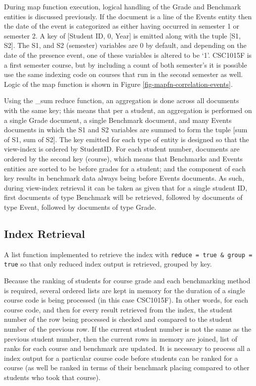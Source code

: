 During map function execution, logical handling of the Grade and Benchmark entities is discussed previously. If the document is a line of the Events entity then the date of the event is categorized as either having occurred in semester 1 or semester 2. A key of [Student ID, 0, Year] is emitted along with the tuple [S1, S2]. The S1, and S2 (semester) variables are 0 by default, and depending on the date of the presence event, one of these variables is altered to be `1'. CSC1015F is a first semester course, but by including a count of both semester's it is possible use the same indexing code on courses that run in the second semester as well. Logic of the map function is shown in Figure \ref{fig-mapfn-correlation-events}.

Using the \_sum reduce function, an aggregation is done across all documents with the same key; this means that per a student, an aggregation is performed on a single Grade document, a single Benchmark document, and many Events documents in which the S1 and S2 variables are summed to form the tuple [sum of S1, sum of S2]. The key emitted for each type of entity is designed so that the view-index is ordered by StudentID. For each student number, documents are ordered by the second key (course), which means that Benchmarks and Events entities are sorted to be before grades for a student; and the  component of each key results in benchmark data always being before Events documents. As such, during view-index retrieval it can be taken as given that for a single student ID, first documents of type Benchmark will be retrieved, followed by documents of type Event, followed by documents of type Grade.



\subsection{Index Retrieval}
A list function implemented to retrieve the index with \texttt{reduce = true \& group = true} so that only reduced index output is retrieved, grouped by key.

Because the ranking of students for course grade and each benchmarking method is required, several ordered lists are kept in memory for the duration of a single course code is being processed (in this case CSC1015F). In other words, for each course code, and then for every result retrieved from the index, the student number of the row being processed is checked and compared to the student number of the previous row. If the current student number is not the same as the previous student number, then the current rows in memory are joined, list of ranks for each course and benchmark are updated. It is necessary to process all a index output for a particular course code before students can be ranked for a course (as well be ranked in terms of their benchmark placing compared to other students who took that course).

